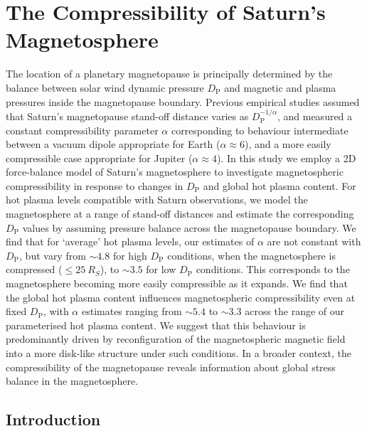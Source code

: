 \chapter{The Compressibility of Saturn's Magnetosphere}
\label{chap:compress}


The location of a planetary magnetopause is principally determined by the balance between solar wind dynamic pressure $D_\mathrm{P}$ and magnetic and plasma pressures inside the magnetopause boundary. Previous empirical studies assumed that Saturn's magnetopause stand-off distance varies as $D_\mathrm{P}^{-1/\alpha}$, and measured a constant compressibility parameter $\alpha$ corresponding to behaviour intermediate between a vacuum dipole appropriate for Earth ($\alpha{\approx}6$), and a more easily compressible case appropriate for Jupiter ($\alpha{\approx}4$). In this study we employ a 2D force-balance model of Saturn's magnetosphere to investigate magnetospheric compressibility in response to changes in $D_\mathrm{P}$ and global hot plasma content. For hot plasma levels compatible with Saturn observations, we model the magnetosphere at a range of stand-off distances and estimate the corresponding $D_\mathrm{P}$ values by assuming pressure balance across the magnetopause boundary. We find that for `average' hot plasma levels, our estimates of $\alpha$ are not constant with $D_\mathrm{P}$, but vary from ${\sim}4.8$ for high $D_\mathrm{P}$ conditions, when the magnetosphere is compressed (${\leq}\SI{25}{R_S}$), to ${\sim}3.5$ for low $D_\mathrm{P}$ conditions. This corresponds to the magnetosphere becoming more easily compressible as it expands. We find that the global hot plasma content influences magnetospheric compressibility even at fixed $D_\mathrm{P}$, with $\alpha$ estimates ranging from ${\sim}5.4$ to ${\sim}3.3$ across the range of our parameterised hot plasma content. We suggest that this behaviour is predominantly driven by reconfiguration of the magnetospheric magnetic field into a more disk-like structure under such conditions. In a broader context, the compressibility of the magnetopause reveals information about global stress balance in the magnetosphere.

\section{Introduction}\label{compress:sec:intro}
